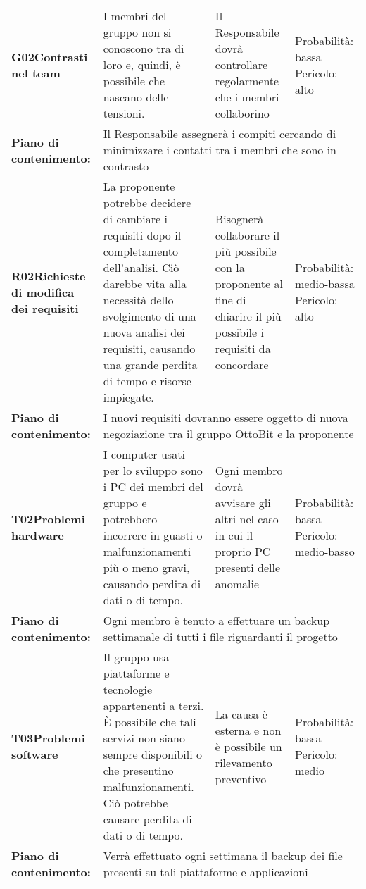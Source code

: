 \begin{longtable}{>{\bfseries}p{2.5cm} p{4.5cm} p{4.5cm} p{2.5cm}}
		\hline
		G02\newline Contrasti nel team
		& I membri del gruppo non si conoscono tra di loro e, quindi, è possibile che nascano delle tensioni. 
		&  Il Responsabile dovrà controllare regolarmente che i membri collaborino
		& Probabilità: bassa \newline Pericolo: alto \\
		\rowcolor{LightGray}
		Piano di contenimento: 
		& \multicolumn{3}{p{12.5cm}}{Il Responsabile assegnerà i compiti cercando di minimizzare i contatti tra i membri che sono in contrasto}\\[0.5cm]

		\hline
		R02\newline Richieste di modifica dei requisiti
		& La proponente potrebbe decidere di cambiare i requisiti dopo il completamento dell'analisi. Ciò darebbe vita alla necessità dello svolgimento di una nuova analisi dei requisiti, causando una grande perdita di tempo e risorse impiegate.
		& Bisognerà collaborare il più possibile con la proponente al fine di chiarire il più possibile i requisiti da concordare
		& Probabilità: medio-bassa \newline Pericolo: alto \\
		\rowcolor{LightGray}
		Piano di contenimento:
		& \multicolumn{3}{p{12.5cm}}{I nuovi requisiti dovranno essere oggetto di nuova negoziazione tra il gruppo OttoBit e la proponente}\\[0.5cm]

		\hline
		T02\newline Problemi hardware
		& I computer usati per lo sviluppo sono i PC dei membri del gruppo e potrebbero incorrere in guasti o malfunzionamenti più o meno gravi, causando perdita di dati o di tempo. 
		& Ogni membro dovrà avvisare gli altri nel caso in cui il proprio PC presenti delle anomalie
		& Probabilità: bassa \newline Pericolo: medio-basso \\
		\rowcolor{LightGray}
		Piano di contenimento: 
		& \multicolumn{3}{p{12.5cm}}{Ogni membro è tenuto a effettuare un backup settimanale di tutti i file riguardanti il progetto}\\[0.5cm]
		
		\hline
		T03\newline Problemi software
		& Il gruppo usa piattaforme e tecnologie appartenenti a terzi. \`E possibile che tali servizi non siano sempre disponibili o che presentino malfunzionamenti. Ciò potrebbe causare perdita di dati o di tempo.
		& La causa è esterna e non è possibile un rilevamento preventivo
		& Probabilità: bassa \newline Pericolo: medio \\
		\rowcolor{LightGray}
		Piano di contenimento: 
		& \multicolumn{3}{p{12.5cm}}{Verrà effettuato ogni settimana il backup dei file presenti su tali piattaforme e applicazioni}\\[0.5cm]
		

\end{longtable}
